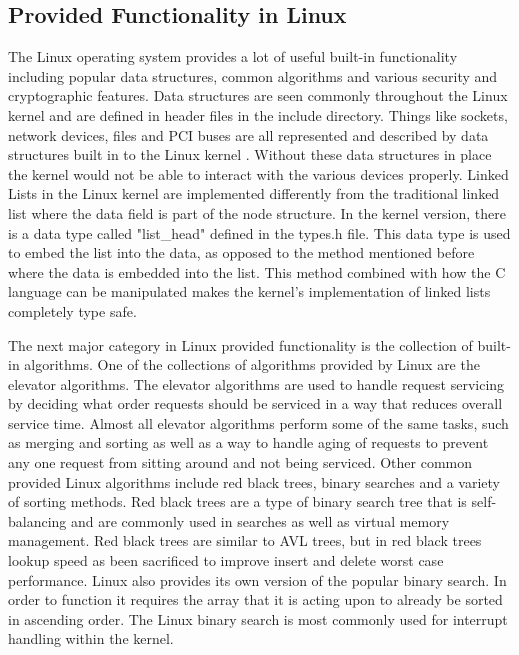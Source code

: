 \documentclass[10pt,serif,draftclsnofoot,onecolumn]{IEEEtran}
\begin{document}
	\subsection{Provided Functionality in Linux}
	\par
	The Linux operating system provides a lot of useful built-in functionality including popular data structures, common algorithms and various security and cryptographic features\cite{2}. Data structures are seen commonly throughout the Linux kernel and are defined in header files in the include directory. Things like sockets, network devices, files and PCI buses are all represented and described by data structures built in to the Linux kernel \cite{7}. Without these data structures in place the kernel would not be able to interact with the various devices properly. Linked Lists in the Linux kernel are implemented differently from the traditional linked list where the data field is part of the node structure. In the kernel version, there is a data type called "list\_head" defined in the types.h file\cite{2}. This data type is used to embed the list into the data, as opposed to the method mentioned before where the data is embedded into the list. This method combined with how the C language can be manipulated makes the kernel's implementation of linked lists completely type safe.
	\newline
	\par
	The next major category in Linux provided functionality is the collection of built-in algorithms. One of the collections of algorithms  provided by Linux are the elevator algorithms. The elevator algorithms are used to handle request servicing by deciding what order requests should be serviced in a way that reduces overall service time\cite{2}. Almost all elevator algorithms perform some of the same tasks, such as merging and sorting as well as a way to handle aging of requests to prevent any one request from sitting around and not being serviced\cite{2}. Other common provided Linux algorithms include red black trees, binary searches and a variety of sorting methods. Red black trees are a type of binary search tree that is self-balancing and are commonly used in searches as well as virtual memory management\cite{9}. Red black trees are similar to AVL trees, but in red black trees lookup speed as been sacrificed to improve insert and delete worst case performance\cite{9}. Linux also provides its own version of the popular binary search. In order to function it requires the array that it is acting upon to already be sorted in ascending order. The Linux binary search is most commonly used for interrupt handling within the kernel.
\end{document}
